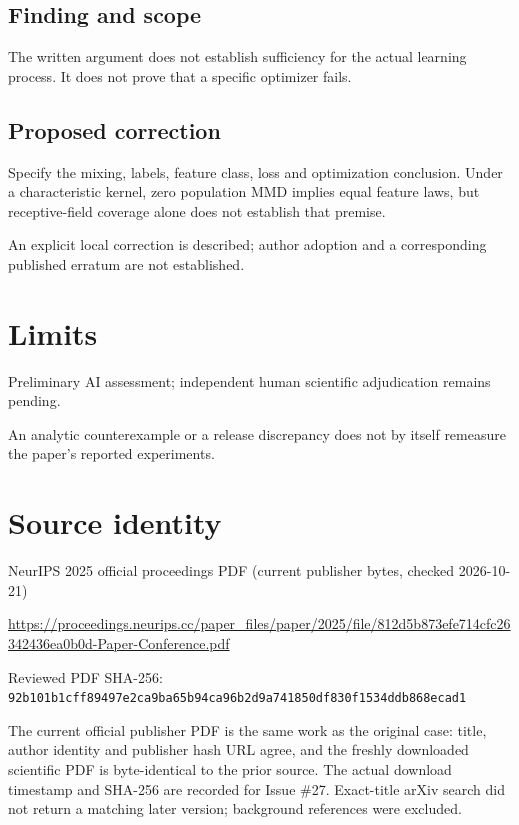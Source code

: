 \documentclass[11pt]{article}
\begin{document}
\subsection*{Finding and scope}

The written argument does not establish sufficiency for the actual learning process. It does not prove that a specific optimizer fails.

\subsection*{Proposed correction}

Specify the mixing, labels, feature class, loss and optimization conclusion. Under a characteristic kernel, zero population MMD implies equal feature laws, but receptive-field coverage alone does not establish that premise.

An explicit local correction is described; author adoption and a corresponding published erratum are not established.

\section*{Limits}

Preliminary AI assessment; independent human scientific adjudication remains pending.\par

An analytic counterexample or a release discrepancy does not by itself remeasure the paper’s reported experiments.\par

\section*{Source identity}

NeurIPS 2025 official proceedings PDF (current publisher bytes, checked 2026-10-21)

\url{https://proceedings.neurips.cc/paper_files/paper/2025/file/812d5b873efe714cfc26342436ea0b0d-Paper-Conference.pdf}

Reviewed PDF SHA-256: \nolinkurl{92b101b1cff89497e2ca9ba65b94ca96b2d9a741850df830f1534ddb868ecad1}

The current official publisher PDF is the same work as the original case: title, author identity and publisher hash URL agree, and the freshly downloaded scientific PDF is byte-identical to the prior source. The actual download timestamp and SHA-256 are recorded for Issue \#27. Exact-title arXiv search did not return a matching later version; background references were excluded.
\end{document}
